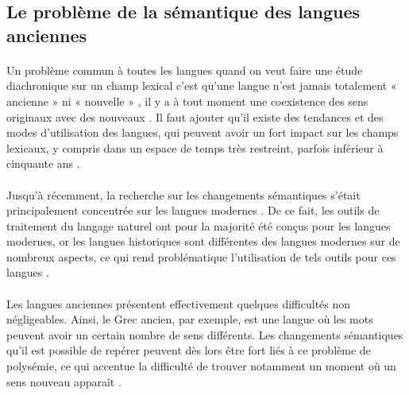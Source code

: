 \documentclass{article}
\begin{document}
\subsection{Le problème de la sémantique des langues anciennes}
\paragraph{}
Un problème commun à toutes les langues quand on veut faire une étude diachronique sur un champ lexical c’est qu’une langue n’est jamais totalement « ancienne » ni « nouvelle » \cite{liebeskind2020deep}, il y a à tout moment une coexistence des sens originaux avec des nouveaux \cite{perrone2019gasc}. Il faut ajouter qu’il existe des tendances et des modes d’utilisation des langues, qui peuvent avoir un fort impact sur les champs lexicaux, y compris dans un espace de temps très restreint, parfois inférieur à cinquante ans \cite{liebeskind2020deep}. 
\paragraph{}
Jusqu’à récemment, la recherche sur les changements sémantiques s’était principalement concentrée sur les langues modernes \cite{perrone2021lexical}. De ce fait, les outils de traitement du langage naturel ont pour la majorité été conçus pour les langues modernes, or les langues historiques sont différentes des langues modernes sur de nombreux aspects, ce qui rend problématique l’utilisation de tels outils pour ces langues \cite{di2021latin}.
\paragraph{}
Les langues anciennes présentent effectivement quelques difficultés non négligeables. Ainsi, le Grec ancien, par exemple, est une langue où les mots peuvent avoir un certain nombre de sens différents. Les changements sémantiques qu’il est possible de repérer peuvent dès lors être fort liés à ce problème de polysémie, ce qui accentue la difficulté de trouver notamment un moment où un sens nouveau apparaît \cite{perrone2019gasc}. 
\end{document}
